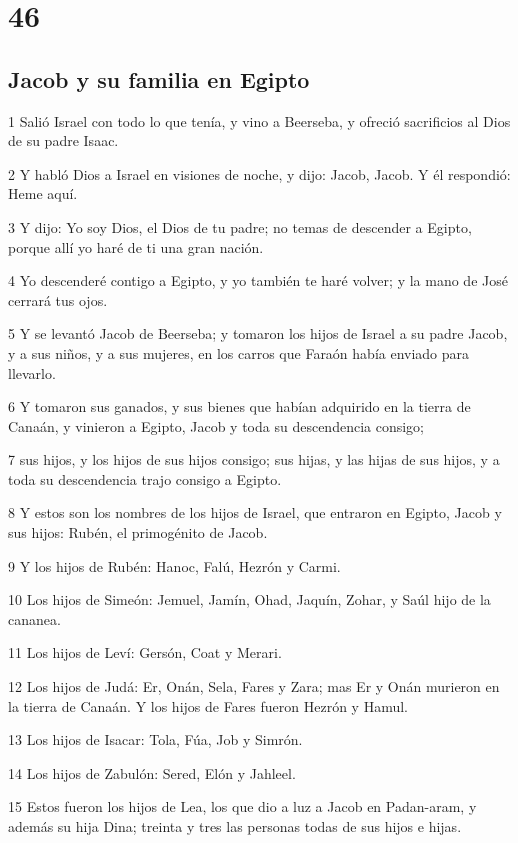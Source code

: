 \chapter{46}

\section*{Jacob y su familia en Egipto}

\par 1 Salió Israel con todo lo que tenía, y vino a Beerseba, y ofreció sacrificios al Dios de su padre Isaac.
\par 2 Y habló Dios a Israel en visiones de noche, y dijo: Jacob, Jacob. Y él respondió: Heme aquí.
\par 3 Y dijo: Yo soy Dios, el Dios de tu padre; no temas de descender a Egipto, porque allí yo haré de ti una gran nación.
\par 4 Yo descenderé contigo a Egipto, y yo también te haré volver; y la mano de José cerrará tus ojos.
\par 5 Y se levantó Jacob de Beerseba; y tomaron los hijos de Israel a su padre Jacob, y a sus niños, y a sus mujeres, en los carros que Faraón había enviado para llevarlo.
\par 6 Y tomaron sus ganados, y sus bienes que habían adquirido en la tierra de Canaán, y vinieron a Egipto, Jacob y toda su descendencia consigo;
\par 7 sus hijos, y los hijos de sus hijos consigo; sus hijas, y las hijas de sus hijos, y a toda su descendencia trajo consigo a Egipto.
\par 8 Y estos son los nombres de los hijos de Israel, que entraron en Egipto, Jacob y sus hijos: Rubén, el primogénito de Jacob.
\par 9 Y los hijos de Rubén: Hanoc, Falú, Hezrón y Carmi.
\par 10 Los hijos de Simeón: Jemuel, Jamín, Ohad, Jaquín, Zohar, y Saúl hijo de la cananea.
\par 11 Los hijos de Leví: Gersón, Coat y Merari.
\par 12 Los hijos de Judá: Er, Onán, Sela, Fares y Zara; mas Er y Onán murieron en la tierra de Canaán. Y los hijos de Fares fueron Hezrón y Hamul.
\par 13 Los hijos de Isacar: Tola, Fúa, Job y Simrón.
\par 14 Los hijos de Zabulón: Sered, Elón y Jahleel.
\par 15 Estos fueron los hijos de Lea, los que dio a luz a Jacob en Padan-aram, y además su hija Dina; treinta y tres las personas todas de sus hijos e hijas.
